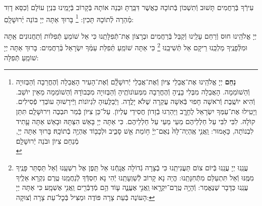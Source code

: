 \documentclass[twoside, openany, parskip=half, 11pt]{book}
\begin{document}
עִירְֿךָ בְּֿרַחֲמִים תָּשׁוּב וְֿתִשְׁכּוֹן בְּֿתוֹכָהּ כַּאֲשֶׁר דִּבַּֽרְתָּ וּבְנֵה אוֹתָהּ בְּֿקָרוֹב בְּֿיָמֵֽינוּ בִּנְיַן עוֹלָם וְֿכִסֵּא דָוִד מְֿהֵרָה לְֿתוֹכָהּ תָּכִין:
\footnote{
\textbf{נַחֵם}
יְיָ אֱלֹהֵֽינוּ אֶת־אֲבֵלֵי צִיּוֺן וְֿאֶת־אֲבֵלֵי יְֿרוּשָׁלַֽ֔֗͏ִם וְֿאֶת־הָעִיר הָאֲבֵלָה וְֿהֶחֳרֵבָה וְֿהַבְּזוּיָה וְֿהַשׁוֺמֵמָה. הָאֲבֵלָה מִבְּלִי בָנֱיהָ וְֿהֶחֳרֵבָה מִמְּעוֺנוֺתֶֽיהָ וְֿהַבְּזוּיָה מִכְּבוֺדָהּ וְֿהַשׁוֺמֵמָה מֵאֵין יוֺשֵׁב. וְֿהִיא יוֺשֶֽׁבֶת וְֿרֹאשָׁה חָפוּי בְּֿאִשָׁה עֲקַרָה שֶׁלֹּא יָלֳדָה. וַיְֿבַלְְּעֽוּהָ לִגְיוֺנוֺת וַיְּֿירָשׁוּהָ עוֺבְדֵי פְֿסִילִים. וַיָטִֽילוּ אֶת־עַמְּךָ יִשְׂרָאֵל לֶחָרֱֽב וַיַּהַרְגוּ בְֿזָדוֺן חֲסִידֵי עֶלְיוֺן. עַל־כֵּן צִיּוֺן בְּֿמַר תּבְכֶּה וִירוּשָׁלַֽ͏ִם תִּתֵּן קוֺלָהּ. לִבִּי לִבִּי עַל חַלְלֵיהֶם מֵעַי מֵעַי עַל חַלְלֵיהֶם. כִּי אַתָּה יְיָ בָּאֵשׁ הִצַּתָּהּ וּבָאֵשׁ אַתָּה עָָתִיד לִבְנוֺתָה, כָּאָמוּר: וַֽאֲנִ֤י אֶֽהְיֶה־לָּהּ֙ נְאֻם־יְיָ֔ ח֥וֹמַת אֵ֖שׁ סָבִ֑יב וּלְכָב֖וֹד אֶהְיֶ֥ה בְֿתוֹכָֽהּ׃
בָּרוּךְ אַתָּה יְיָ, מְֿנַחֵם צִיוֺן וּבֹנֵה יְֿרוּשָׁלַֽ͏ִם׃ \\
}
בָּרוּךְ אַתָּה יְיָ בּוֹנֵה יְֿרוּשָׁלָֽםִ:

\weekdaysamalchus

יְיָ אֱלֹהֵֽינוּ חוּס וְֿרַחֵם עָלֵֽינוּ וְֿקַבֵּל בְּֿרַחֲמִים וּבְרָצוֹן אֶת־תְּֿפִלָּתֵֽנוּ כִּי אֵל שׁוֹמֵעַ תְּֿפִלּוֹת וְֿתַחֲנוּנִים אַֽתָּה וּמִלְּֿפָנֶֽיךָ מַלְכֵּֽנוּ רֵיקָם אַל תְּֿשִׁיבֵֽנוּ
\footnote{
עֲנֵֽנוּ יְיָ עֲנֵֽנוּ בְּֿיוֹם צוֹם תַּעֲנִיתֵֽנוּ כִּי בְֿצָרָה גְֿדוֹלָה אֲנָֽחְֿנוּ אַל תֵּֽפֶן אֶל רִשְׁעֵֽנוּ וְֿאַל תַּסְתֵּר פָּנֶֽיךָ מִמֶּֽנּוּ וְֿאַל תִּתְעַלַּם מִתְּֿחִנָּתֵֽנוּ: הֱיֵה נָא קָרוֹב לְֿשַׁוְעָתֵֽנוּ יְֿהִי נָא חַסְדְּֿךָ לְֿנַחֲמֵֽנוּ טֶֽרֶם נִקְרָא אֵלֶֽיךָ עֲנֵֽנוּ כַּדָּבָר שֶׁנֶּאֱמַר:
וְֿהָיָ֥ה טֶֽרֶם־יִקְרָ֖אוּ וַֽאֲנִ֣י אֶעֱנֶ֑ה ע֛וֹד הֵ֥ם מְֿדַבְּֿרִ֖ים וַֽאֲנִ֥י אֶשְׁמָֽע׃ כִּי אַתָּה יְיָ הָעוֹנֶה בְּֿעֵת צָרָה פּוֹדֶה וּמַצִּיל בְּֿכׇל־עֵת צָרָה וְֿצוּקָה:
}
כִּי אַתָּה שׁוֹמֵֽעַ תְּֿפִלַּת עַמְּֿךָ יִשְׂרָאֵל בְּֿרַחֲמִים: בָּרוּךְ אַתָּה יְיָ שׁוֹמֵֽעַ תְּֿפִלָּה:

\retzeh

\yaalehveyavo

\zion

\modim

\clearpage

\alhanisim

\weekdaysahodos
\end{document}
